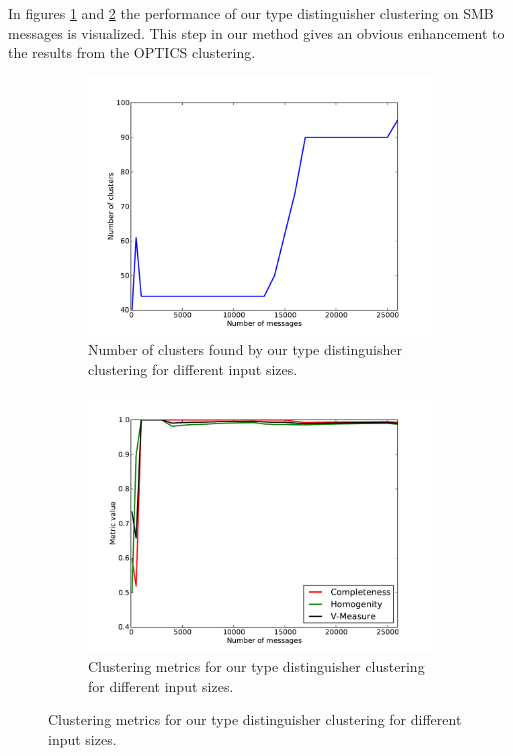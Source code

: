 \documentclass[a4paper]{report}
\begin{document}
In figures \ref{fig:num_td} and \ref{fig:metrics_td} the performance of our
type distinguisher clustering on SMB messages is visualized. This step in
our method gives an obvious enhancement to the results from the OPTICS
clustering.

\begin{figure}[h]
    \centering
    \begin{subfigure}[t]{0.48\textwidth}
        \includegraphics[width=\textwidth]{img/num_td}
        \caption{Number of clusters found by our type distinguisher clustering
            for different input sizes.}
        \label{fig:num_td}
    \end{subfigure}
    \quad
    \begin{subfigure}[t]{0.48\textwidth}
        \includegraphics[width=\textwidth]{img/metrics_td}
        \caption{Clustering metrics for our type distinguisher clustering for
            different input sizes.}
        \label{fig:metrics_td}
    \end{subfigure}
    \label{fig:td_res}
\end{figure}
\end{document}
